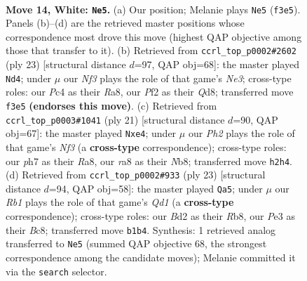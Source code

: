 \documentclass[11pt]{article}
\begin{document}
\clearpage

\begin{figure}[p]\centering
\begin{subfigure}{0.46\textwidth}\centering
\resizebox{\linewidth}{!}{%
\newchessgame
\chessboard[
  setfen={rnb3k1/pp1qr1pp/2p1pn2/5p2/2PP4/2b1PNP1/P2B1PBP/1R1QR1K1 w - - 0 14},
  showmover=false,
  pgfstyle=straightmove, color=movearrow, markmove={f3-e5}
]}
\caption{}
\end{subfigure}\hfill
\begin{subfigure}{0.46\textwidth}\centering
\resizebox{\linewidth}{!}{%
\newchessgame
\chessboard[
  setfen={r1bq1rk1/p3ppbp/1pp1n1pB/2p1P3/8/2NP1N1P/PPPQ1PP1/R4RK1 b - - 4 12},
  showmover=false,
  pgfstyle=straightmove, color=movearrow, markmove={e6-d4}
]}
\caption{}
\end{subfigure}
\\[4pt]
\begin{subfigure}{0.46\textwidth}\centering
\resizebox{\linewidth}{!}{%
\newchessgame
\chessboard[
  setfen={rnbq1rk1/1p3pb1/p2p1npB/2pP4/4P3/2N2P2/PP1Q2PP/R3KBNR b KQ - 0 11},
  showmover=false,
  pgfstyle=straightmove, color=movearrow, markmove={f6-e4}
]}
\caption{}
\end{subfigure}\hfill
\begin{subfigure}{0.46\textwidth}\centering
\resizebox{\linewidth}{!}{%
\newchessgame
\chessboard[
  setfen={1rbq1rk1/p4pbp/n2p1np1/1B1Pp1B1/4P2P/2N5/PP1Q1PP1/1R2K1NR b K - 2 12},
  showmover=false,
  pgfstyle=straightmove, color=movearrow, markmove={d8-a5}
]}
\caption{}
\end{subfigure}
\caption{\textbf{Move 14, White: \texttt{Ne5}.} (a) Our position; Melanie plays \texttt{Ne5} (\texttt{f3e5}). Panels (b)--(d) are the retrieved master positions whose correspondence most drove this move (highest QAP objective among those that transfer to it). (b) Retrieved from \texttt{ccrl\_top\_p0002\#2602} (ply 23) [structural distance $d$=97, QAP obj=68]: the master played \texttt{Nd4}; under $\mu$ our \emph{Nf3} plays the role of that game's \emph{Ne3}; cross-type roles: our \emph{P}c4 as their \emph{R}a8, our \emph{P}f2 as their \emph{Q}d8; transferred move \texttt{f3e5} \textbf{(endorses this move)}. (c) Retrieved from \texttt{ccrl\_top\_p0003\#1041} (ply 21) [structural distance $d$=90, QAP obj=67]: the master played \texttt{Nxe4}; under $\mu$ our \emph{Ph2} plays the role of that game's \emph{Nf3} (a \textbf{cross-type} correspondence); cross-type roles: our \emph{p}h7 as their \emph{R}a8, our \emph{r}a8 as their \emph{N}b8; transferred move \texttt{h2h4}. (d) Retrieved from \texttt{ccrl\_top\_p0002\#933} (ply 23) [structural distance $d$=94, QAP obj=58]: the master played \texttt{Qa5}; under $\mu$ our \emph{Rb1} plays the role of that game's \emph{Qd1} (a \textbf{cross-type} correspondence); cross-type roles: our \emph{B}d2 as their \emph{R}b8, our \emph{P}e3 as their \emph{B}c8; transferred move \texttt{b1b4}. Synthesis: 1 retrieved analog transferred to \texttt{Ne5} (summed QAP objective 68, the strongest correspondence among the candidate moves); Melanie committed it via the \texttt{search} selector.}
\label{fig:thought-m26}
\end{figure}
\end{document}
